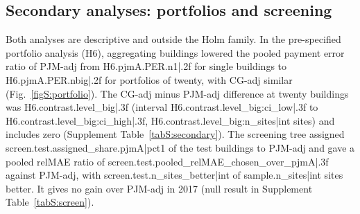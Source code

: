 \subsection{Secondary analyses: portfolios and screening}\label{sec:results:secondary}

Both analyses are descriptive and outside the Holm family. In the pre-specified portfolio analysis (H6), aggregating buildings lowered the pooled payment error ratio of PJM-adj from {{H6.pjmA.PER.n1|.2f}} for single buildings to {{H6.pjmA.PER.nbig|.2f}} for portfolios of twenty, with CG-adj similar (Fig.~\ref{figS:portfolio}). The CG-adj minus PJM-adj difference at twenty buildings was {{H6.contrast.level_big|.3f}} (interval {{H6.contrast.level_big:ci_low|.3f}} to {{H6.contrast.level_big:ci_high|.3f}}, {{H6.contrast.level_big:n_sites|int}} sites) and includes zero (Supplement Table~\ref{tabS:secondary}). The screening tree assigned {{screen.test.assigned_share.pjmA|pct1}} of the test buildings to PJM-adj and gave a pooled relMAE ratio of {{screen.test.pooled_relMAE_chosen_over_pjmA|.3f}} against PJM-adj, with {{screen.test.n_sites_better|int}} of {{sample.n_sites|int}} sites better. It gives no gain over PJM-adj in 2017 (null result in Supplement Table~\ref{tabS:screen}).
